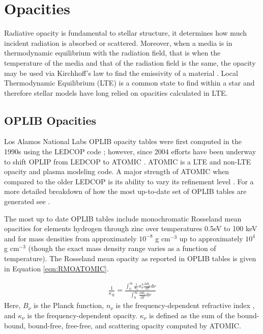 \section{Opacities}\label{sec:opac}
Radiative opacity is fundamental to stellar structure, it determines how much
incident radiation is absorbed or scattered. Moreover, when a media is in
thermodynamic equilibrium with the radiation field, that is when the temperature
of the media and that of the radiation field is the same, the opacity may be
used via Kirchhoff's law to find the emissivity of a material
\citep{Huebner2014}. Local Thermodynamic Equilibrium (LTE) is a common state to
find within a star and therefore stellar models have long relied on opacities
calculated in LTE.

\subsection{OPLIB Opacities}
Los Alamos National Labs OPLIB opacity tables were first computed in the 1990s
using the LEDCOP code \citep{Magee1995}; however, since 2004 efforts have been
underway to shift OPLIP from LEDCOP to ATOMIC \citep{Magee2004}. ATOMIC is a
LTE and non-LTE opacity and plasma modeling code. A major strength of ATOMIC
when compared to the older LEDCOP is its ability to vary its refinement level
\citep{Fontes2016}. For a more detailed breakdown of how the most up-to-date
set of OPLIB tables are generated see \citep{Colgan2016}.

The most up to date OPLIB tables include monochromatic Rosseland mean opacities
for elements hydrogen through zinc over temperatures 0.5eV to 100 keV and for
mass densities from approximately $10^{-8}$ g cm$^{-3}$ up to approximately
$10^{4}$ g cm$^{-3}$ (though the exact mass density range varies as a function
of temperature). The Rosseland mean opacity as reported in OPLIB tables is given
in Equation \ref{eqn:RMOATOMIC}.

\begin{align}\label{eqn:RMOATOMIC}
	\frac{1}{\kappa_{R}} =
		\frac{\int_{0}^{\infty}\frac{1}{\kappa_{\nu}}n_{\nu}^{3}\frac{\partial
		B_{\nu}}{\partial T}d\nu}{\int_{0}^{\infty}\frac{\partial B_{\nu}}{\partial
		T}d\nu}
\end{align}
Here, $B_{\nu}$ is the Planck function, $n_{\nu}$ is the frequency-dependent
refractive index \citep{Armstrong2014}, and $\kappa_{\nu}$ is the
frequency-dependent opacity. $\kappa_{\nu}$ is defined as the sum of the
bound-bound, bound-free, free-free, and scattering opacity computed by ATOMIC.

